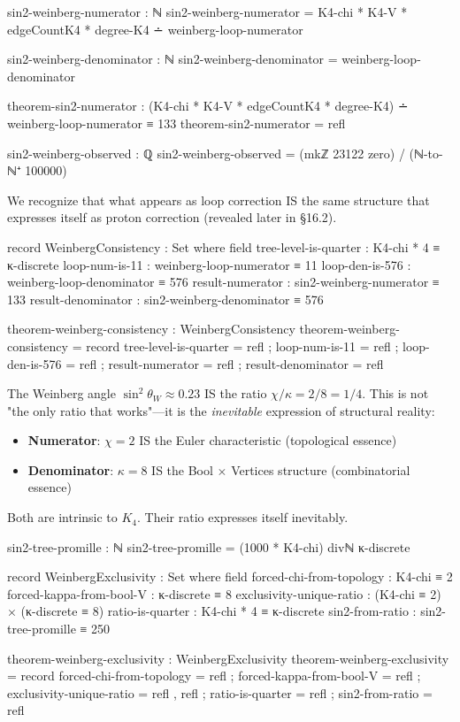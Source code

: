 \documentclass[11pt,a4paper]{book}
\begin{document}
\begin{code}
sin2-weinberg-numerator : ℕ
sin2-weinberg-numerator = K4-chi * K4-V * edgeCountK4 * degree-K4 ∸ weinberg-loop-numerator

sin2-weinberg-denominator : ℕ
sin2-weinberg-denominator = weinberg-loop-denominator

theorem-sin2-numerator : (K4-chi * K4-V * edgeCountK4 * degree-K4) ∸ weinberg-loop-numerator ≡ 133
theorem-sin2-numerator = refl

sin2-weinberg-observed : ℚ
sin2-weinberg-observed = (mkℤ 23122 zero) / (ℕ-to-ℕ⁺ 100000)
\end{code}

We recognize that what appears as loop correction IS the same structure that expresses itself as proton correction (revealed later in \S 16.2).

\begin{code}
record WeinbergConsistency : Set where
  field
    tree-level-is-quarter : K4-chi * 4 ≡ κ-discrete
    loop-num-is-11 : weinberg-loop-numerator ≡ 11
    loop-den-is-576 : weinberg-loop-denominator ≡ 576
    result-numerator : sin2-weinberg-numerator ≡ 133
    result-denominator : sin2-weinberg-denominator ≡ 576

theorem-weinberg-consistency : WeinbergConsistency
theorem-weinberg-consistency = record
  { tree-level-is-quarter = refl
  ; loop-num-is-11 = refl
  ; loop-den-is-576 = refl
  ; result-numerator = refl
  ; result-denominator = refl
  }
\end{code}

The Weinberg angle $\sin^2\theta_W \approx 0.23$ IS the ratio $\chi/\kappa = 2/8 = 1/4$. This is not "the only ratio that works"—it is the \emph{inevitable} expression of structural reality:
\begin{itemize}
\item \textbf{Numerator}: $\chi = 2$ IS the Euler characteristic (topological essence)
\item \textbf{Denominator}: $\kappa = 8$ IS the Bool $\times$ Vertices structure (combinatorial essence)
\end{itemize}
Both are intrinsic to $K_4$. Their ratio expresses itself inevitably.

\begin{code}
sin2-tree-promille : ℕ
sin2-tree-promille = (1000 * K4-chi) divℕ κ-discrete

record WeinbergExclusivity : Set where
  field
    forced-chi-from-topology   : K4-chi ≡ 2
    forced-kappa-from-bool-V   : κ-discrete ≡ 8
    exclusivity-unique-ratio   : (K4-chi ≡ 2) × (κ-discrete ≡ 8)
    ratio-is-quarter           : K4-chi * 4 ≡ κ-discrete
    sin2-from-ratio            : sin2-tree-promille ≡ 250

theorem-weinberg-exclusivity : WeinbergExclusivity
theorem-weinberg-exclusivity = record
  { forced-chi-from-topology = refl
  ; forced-kappa-from-bool-V = refl
  ; exclusivity-unique-ratio = refl , refl
  ; ratio-is-quarter = refl
  ; sin2-from-ratio = refl
  }
\end{code}
\end{document}
